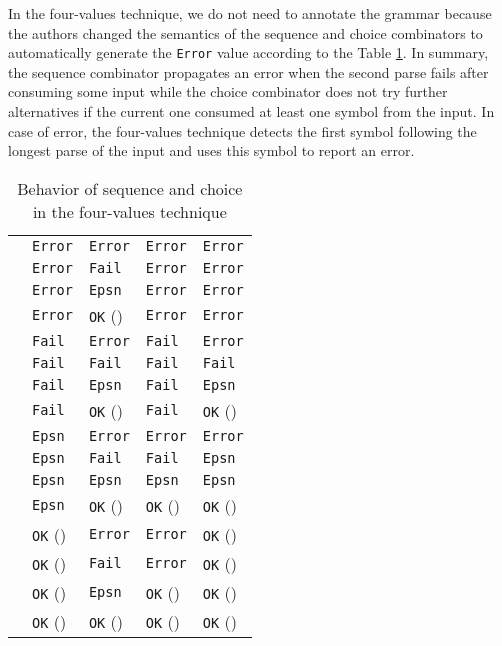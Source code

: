 \documentclass[3p,12pt,singlecolumn]{elsarticle}
\begin{document}
In the four-values technique, we do not need to annotate the grammar
because the authors changed the semantics of the sequence and choice
combinators to automatically generate the \texttt{Error} value
according to the Table \ref{tab:fv}.
In summary, the sequence combinator propagates an error when the
second parse fails after consuming some input while
the choice combinator does not try further alternatives
if the current one consumed at least one symbol from the input.
In case of error, the four-values technique detects the first symbol
following the longest parse of the input and uses this symbol to
report an error.

\begin{table}[t]
\begin{center}
\begin{tabular}{p{1cm}p{2cm}p{2cm}p{2cm}p{2cm}}
\hline
&  &  &  & \\
\hline
& \texttt{Error} & \texttt{Error} & \texttt{Error} & \texttt{Error} \\
& \texttt{Error} & \texttt{Fail} & \texttt{Error} & \texttt{Error} \\
& \texttt{Error} & \texttt{Epsn} & \texttt{Error} & \texttt{Error} \\
& \texttt{Error} & \texttt{OK} () & \texttt{Error} & \texttt{Error} \\
& \texttt{Fail} & \texttt{Error} & \texttt{Fail} & \texttt{Error} \\
& \texttt{Fail} & \texttt{Fail} & \texttt{Fail} & \texttt{Fail} \\
& \texttt{Fail} & \texttt{Epsn} & \texttt{Fail} & \texttt{Epsn} \\
& \texttt{Fail} & \texttt{OK} () & \texttt{Fail} & \texttt{OK} () \\
& \texttt{Epsn} & \texttt{Error} & \texttt{Error} & \texttt{Error} \\
& \texttt{Epsn} & \texttt{Fail} & \texttt{Fail} & \texttt{Epsn} \\
& \texttt{Epsn} & \texttt{Epsn} & \texttt{Epsn} & \texttt{Epsn} \\
& \texttt{Epsn} & \texttt{OK} () & \texttt{OK} () & \texttt{OK} () \\
& \texttt{OK} () & \texttt{Error} & \texttt{Error} & \texttt{OK} () \\
& \texttt{OK} () & \texttt{Fail} & \texttt{Error} & \texttt{OK} () \\
& \texttt{OK} () & \texttt{Epsn} & \texttt{OK} () & \texttt{OK} () \\
& \texttt{OK} () & \texttt{OK} () & \texttt{OK} () & \texttt{OK} () \\
\end{tabular}
\end{center}
\caption{Behavior of sequence and choice in the four-values technique}
\label{tab:fv}
\end{table}
\end{document}
